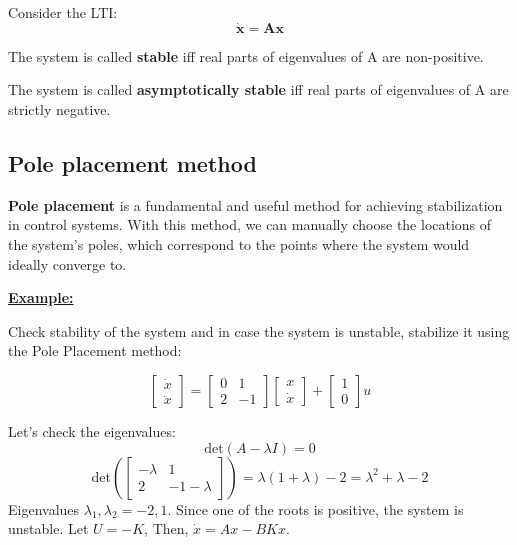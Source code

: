 Consider the LTI:
\[\mathbf{\dot x} = \mathbf{A} \mathbf{x}\]

\begin{tcolorbox}[colback=green!10,colframe=green!50!black]
    The system is called \textbf{stable} iff real parts of eigenvalues of A are non-positive.
\end{tcolorbox}

\begin{tcolorbox}[colback=green!10,colframe=green!50!black]
    The system is called \textbf{asymptotically stable} iff real parts of eigenvalues of A are  strictly negative. 
\end{tcolorbox}

\subsection{Pole placement method}

\textbf{Pole placement} is a fundamental and useful method for achieving stabilization in control systems. With this method, we can manually choose the locations of the system's poles, which correspond to the points where the system would ideally converge to.

\begin{center}
    \underline{\textbf{Example:}}

\end{center}
Check stability of the system and in case the system is unstable, stabilize it using the Pole Placement method:

\[
\begin{bmatrix}
\dot{x} \\
\ddot{x}
\end{bmatrix} = 
\begin{bmatrix}
0 & 1  \\
2 & -1  
\end{bmatrix}
\begin{bmatrix}
x \\
\dot{x} 
\end{bmatrix} + 
\begin{bmatrix}
1 \\
0 
\end{bmatrix} u
\]

Let's check the eigenvalues:
\[
\text{det} (A - \lambda I) = 0
\]
\[
\text{det}\left(\begin{bmatrix}-\lambda & 1 \\ 2 & -1 - \lambda\end{bmatrix}\right) = \lambda(1 + \lambda) -2 = \lambda^2 + \lambda - 2
\]
Eigenvalues \( \lambda_1, \lambda_2 = -2, 1 \).
Since one of the roots is positive, the system is unstable. Let \( U = -K \),
Then, \( \dot{x} = Ax - BKx \).

